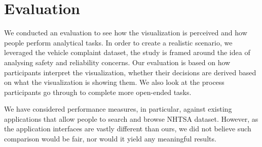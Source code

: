 % 


\section{Evaluation}
We conducted an evaluation to see how the visualization is perceived and how
people perform analytical tasks. In order to create a realistic scenario, we
leveraged the vehicle complaint dataset, the study is framed around the idea of
analysing safety and reliability concerns. Our evaluation is based on how
participants interpret the visualization, whether their decisions are derived
based on what the visualization is showing them. We also look at the process
participants go through to complete more open-ended tasks.


We have considered performance measures, in particular, against existing applications
that allow people to search and browse NHTSA dataset. However, as the application
interfaces are vastly different than ours, we did not believe such comparison would
be fair, nor would it yield any meaningful results.

